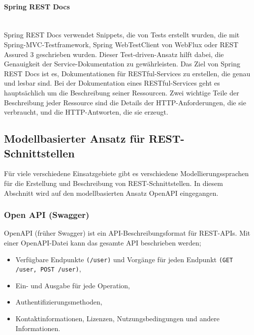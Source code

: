 \paragraph{Spring REST Docs}\mbox{}\\

Spring REST Docs verwendet Snippets, die von Tests erstellt wurden, die mit Spring-MVC-Testframework, Spring WebTestClient von WebFlux oder REST Assured 3 geschrieben wurden. Dieser Test-driven-Ansatz hilft dabei, die Genauigkeit der Service-Dokumentation zu gewährleisten. Das Ziel von Spring REST Docs ist es, Dokumentationen für RESTful-Services zu erstellen, die genau und lesbar sind. Bei der Dokumentation eines RESTful-Services geht es hauptsächlich um die Beschreibung seiner Ressourcen. Zwei wichtige Teile der Beschreibung jeder Ressource sind die Details der HTTP-Anforderungen, die sie verbraucht, und die HTTP-Antworten, die sie erzeugt\cite{srd18wilkinson}.

\subsection{Modellbasierter Ansatz für REST-Schnittstellen}

Für viele verschiedene Einsatzgebiete gibt es verschiedene Modellierungssprachen für die Erstellung und Beschreibung von REST-Schnittstellen. In diesem Abschnitt wird auf den modellbasierten Ansatz OpenAPI eingegangen.

\subsubsection{Open API (Swagger)}

OpenAPI (früher Swagger) ist ein API-Beschreibungsformat für REST-APIs. Mit einer OpenAPI-Datei kann das gesamte API beschrieben werden\cite{openapi13def};

\begin{itemize}
	
	\item Verfügbare Endpunkte \texttt{(/user)} und Vorgänge für jeden Endpunkt \texttt{(GET /user, POST /user)},
	
	\item Ein- und Ausgabe für jede Operation,
	
	\item Authentifizierungsmethoden,
	
	\item Kontaktinformationen, Lizenzen, Nutzungsbedingungen und andere Informationen.
	
\end{itemize}

